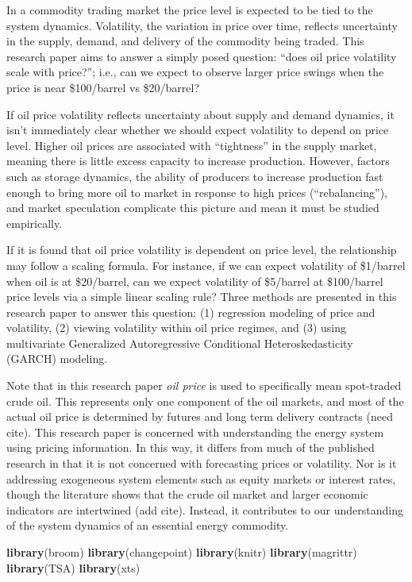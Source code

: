 \documentclass[11pt,]{article}
\newenvironment{Shaded}{\begin{snugshade}}{\end{snugshade}}
\newcommand{\KeywordTok}[1]{\textcolor[rgb]{0.13,0.29,0.53}{\textbf{{#1}}}}
\newcommand{\NormalTok}[1]{{#1}}
\begin{document}
In a commodity trading market the price level is expected to be tied to
the system dynamics. Volatility, the variation in price over time,
reflects uncertainty in the supply, demand, and delivery of the
commodity being traded. This research paper aims to answer a simply
posed question: ``does oil price volatility scale with price?''; i.e.,
can we expect to observe larger price swings when the price is near
\$100/barrel vs \$20/barrel?

If oil price volatility reflects uncertainty about supply and demand
dynamics, it isn't immediately clear whether we should expect volatility
to depend on price level. Higher oil prices are associated with
``tightness'' in the supply market, meaning there is little excess
capacity to increase production. However, factors such as storage
dynamics, the ability of producers to increase production fast enough to
bring more oil to market in response to high prices (``rebalancing''),
and market speculation complicate this picture and mean it must be
studied empirically.

If it is found that oil price volatility is dependent on price level,
the relationship may follow a scaling formula. For instance, if we can
expect volatility of \$1/barrel when oil is at \$20/barrel, can we
expect volatility of \$5/barrel at \$100/barrel price levels via a
simple linear scaling rule? Three methods are presented in this research
paper to answer this question: (1) regression modeling of price and
volatility, (2) viewing volatility within oil price regimes, and (3)
using multivariate Generalized Autoregressive Conditional
Heteroskedasticity (GARCH) modeling.

Note that in this research paper \emph{oil price} is used to
specifically mean spot-traded crude oil. This represents only one
component of the oil markets, and most of the actual oil price is
determined by futures and long term delivery contracts (need cite). This
research paper is concerned with understanding the energy system using
pricing information. In this way, it differs from much of the published
research in that it is not concerned with forecasting prices or
volatility. Nor is it addressing exogeneous system elements such as
equity markets or interest rates, though the literature shows that the
crude oil market and larger economic indicators are intertwined (add
cite). Instead, it contributes to our understanding of the system
dynamics of an essential energy commodity.

\begin{Shaded}
\begin{Highlighting}[]
\KeywordTok{library}\NormalTok{(broom)}
\KeywordTok{library}\NormalTok{(changepoint)}
\KeywordTok{library}\NormalTok{(knitr)}
\KeywordTok{library}\NormalTok{(magrittr)}
\KeywordTok{library}\NormalTok{(TSA)}
\KeywordTok{library}\NormalTok{(xts)}
\end{Highlighting}
\end{Shaded}
\end{document}

